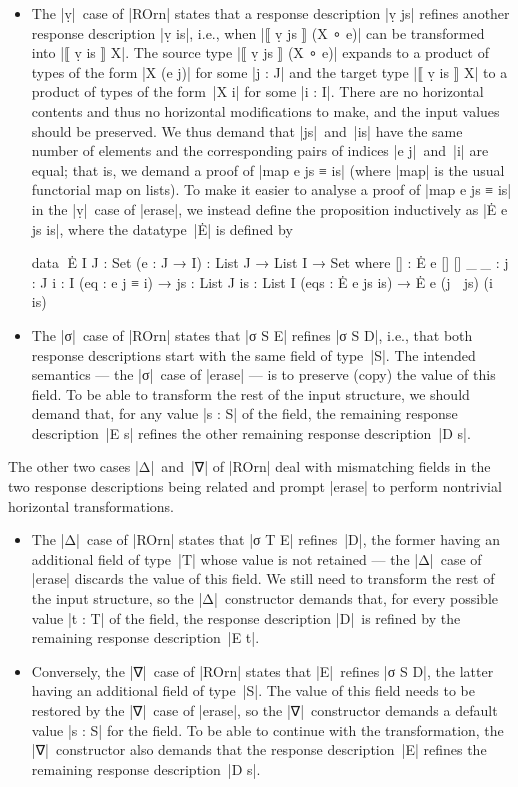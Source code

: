 \begin{itemize}
\item The |ṿ|~case of |ROrn| states that a response description |ṿ js| refines another response description |ṿ is|, i.e., when |⟦ ṿ js ⟧ (X ∘ e)| can be transformed into |⟦ ṿ is ⟧ X|.
The source type |⟦ ṿ js ⟧ (X ∘ e)| expands to a product of types of the form |X (e j)| for some |j : J| and the target type |⟦ ṿ is ⟧ X| to a product of types of the form~|X i| for some |i : I|.
There are no horizontal contents and thus no horizontal modifications to make, and the input values should be preserved.
We thus demand that |js|~and~|is| have the same number of elements and the corresponding pairs of indices |e j|~and~|i| are equal; that is, we demand a proof of |map e js ≡ is| (where |map| is the usual functorial map on lists).
To make it easier to analyse a proof of |map e js ≡ is| in the |ṿ|~case of |erase|, we instead define the proposition inductively as |Ė e js is|, where the datatype~|Ė| is defined by
\begin{code}
data ^^^Ė {I J : Set} (e : J → I) : List J → List I → Set where
  []   :  Ė e [] []
  _∷_  :  {j : J} {i : I} (eq : e j ≡ i) →
          {js : List J} {is : List I} (eqs : Ė e js is) → Ė e (j ∷ js) (i ∷ is)
\end{code}
\item The |σ|~case of |ROrn| states that |σ S E| refines |σ S D|, i.e., that both response descriptions start with the same field of type~|S|.
The intended semantics --- the |σ|~case of |erase| --- is to preserve (copy) the value of this field.
To be able to transform the rest of the input structure, we should demand that, for any value |s : S| of the field, the remaining response description~|E s| refines the other remaining response description~|D s|.
\end{itemize}
The other two cases |Δ|~and~|∇| of |ROrn| deal with mismatching fields in the two response descriptions being related and prompt |erase| to perform nontrivial horizontal transformations.
\begin{itemize}
\item The |Δ|~case of |ROrn| states that |σ T E| refines~|D|, the former having an additional field of type~|T| whose value is not retained --- the |Δ|~case of |erase| discards the value of this field.
We still need to transform the rest of the input structure, so the |Δ|~constructor demands that, for every possible value |t : T| of the field, the response description |D|~is refined by the remaining response description~|E t|.
\item Conversely, the |∇|~case of |ROrn| states that |E|~refines |σ S D|, the latter having an additional field of type~|S|.
The value of this field needs to be restored by the |∇|~case of |erase|, so the |∇|~constructor demands a default value |s : S| for the field.
To be able to continue with the transformation, the |∇|~constructor also demands that the response description~|E| refines the remaining response description~|D s|.
\end{itemize}

